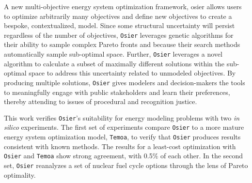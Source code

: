A new multi-objective energy system optimization framework, \gls{osier} allows
users to optimize arbitrarily many objectives and define new objectives to
create a bespoke, contextualized, model. Since some structural uncertainty will
persist regardless of the number of objectives, \texttt{Osier} leverages genetic
algorithms for their ability to sample complex Pareto fronts and because their
search methods automatically sample sub-optimal space. Further, \texttt{Osier}
leverages a novel algorithm to calculate a subset of maximally different
solutions within the sub-optimal space to address this uncertainty related to
unmodeled objectives. By producing multiple solutions, \texttt{Osier} gives
modelers and decision-makers the tools to meaningfully engage with public
stakeholders and learn their preferences, thereby attending to issues of
procedural and recognition justice.

This work verifies \texttt{Osier}'s suitability for energy modeling problems
with two \textit{in silico} experiments. The first set of experiments compare
\texttt{Osier} to a more mature energy system optimization model,
\texttt{Temoa}, to verify that \texttt{Osier} produces results consistent with
known methods. The results for a least-cost optimization with \texttt{Osier} and
\texttt{Temoa} show strong agreement, with 0.5\% of each other. In the second
set, \texttt{Osier} reanalyzes a set of nuclear fuel cycle options through the
lens of Pareto optimality.
